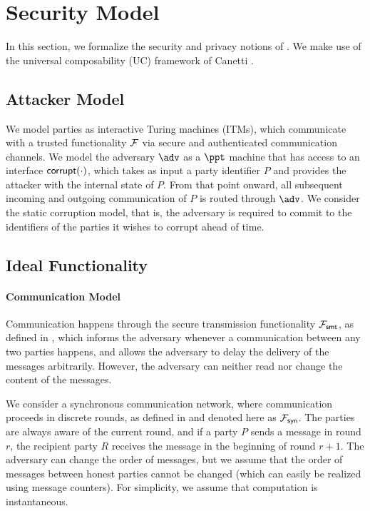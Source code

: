 \section{Security Model}
\label{sec:security-model}



In this section, we formalize the security and privacy notions of \sysname. We make use of 
the universal composability (UC) framework of Canetti \cite{canetti}.

\subsection{Attacker Model}
\label{sec:attacker-model}

We model parties as interactive Turing machines (ITMs), which communicate with a trusted 
functionality $\mathcal{F}$ via secure and authenticated communication channels. We model the 
adversary $\adv$ as a $\ppt$ machine that has access to an interface $\mathsf{corrupt}(\cdot)$, 
which takes as input a party identifier $P$ and provides the attacker with the internal 
state of $P$. From that point onward, all subsequent incoming and outgoing communication 
of $P$ is routed through $\adv$. We consider the static corruption model, that is, the 
adversary is required to commit to the identifiers of the parties it wishes to corrupt 
ahead of time.

\subsection{Ideal Functionality}
\label{sec:ideal-func}

\paragraph{Communication Model}
Communication happens through the secure transmission functionality $\mathcal{F}_{\mathsf{smt}}$, as 
defined in \cite{canetti}, which informs the adversary whenever a communication between 
any two parties happens, and allows the adversary to delay the delivery of the messages 
arbitrarily. However, the adversary can neither read nor change the content of the messages.

We consider a synchronous communication network, where communication proceeds in discrete 
rounds, as defined in \cite{kmtz} and denoted here as $\mathcal{F}_{\mathsf{syn}}$. The parties are 
always aware of the current round, and if a party $P$ sends a message in round $r$, 
the recipient party $R$ receives the message in the beginning of round $r + 1$. The 
adversary can change the order of messages, but we assume that the order of messages 
between honest parties cannot be changed (which can easily be realized using message 
counters). For simplicity, we assume that computation is instantaneous.

